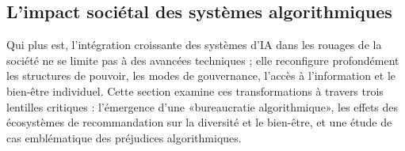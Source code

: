 \subsection{L'impact sociétal des systèmes algorithmiques}

Qui plus est, l'intégration croissante des systèmes d'IA dans les rouages de la société ne se limite pas à des avancées techniques ; elle reconfigure profondément les structures de pouvoir, les modes de gouvernance, l'accès à l'information et le bien-être individuel. Cette section examine ces transformations à travers trois lentilles critiques : l'émergence d'une «bureaucratie algorithmique», les effets des écosystèmes de recommandation sur la diversité et le bien-être, et une étude de cas emblématique des préjudices algorithmiques.
